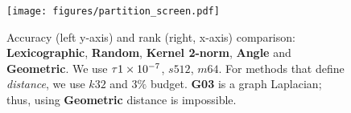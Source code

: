 

\begin{figure}[!t]
  \centering
  \texttt{[image: figures/partition\_screen.pdf]}
  \caption{
    Accuracy (left y-axis) and rank (right, x-axis) comparison:
    \textbf{Lexicographic}, \textbf{Random}, \textbf{Kernel 2-norm},
    \textbf{Angle} and \textbf{Geometric}.
    We use $\tau\num{1E-7}$, $s512$, $m64$. For methods that define 
    \emph{distance}, we use $k32$ and $3\%$ budget.
    \textbf{G03} is a graph Laplacian; thus, using
    \textbf{Geometric} distance is impossible.
  }
  \label{fig:partition}
\end{figure}

